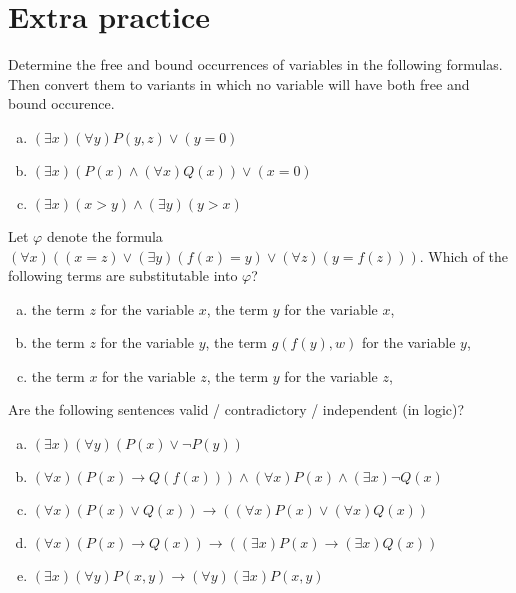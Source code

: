         
        
\section*{Extra practice}


\begin{problem}

    Determine the free and bound occurrences of variables in the following formulas. Then convert them to variants in which no variable will have both free and bound occurence.
    \begin{enumerate}[(a)]
        \item $(\exists x)(\forall y)P(y,z) \vee (y=0)$
        \item $(\exists x)(P(x) \wedge (\forall x)Q(x)) \vee (x=0)$
        \item $(\exists x)(x>y) \wedge (\exists y)(y>x)$
    \end{enumerate}

\end{problem}


\begin{problem}
    
    Let $\varphi$ denote the formula $(\forall x)((x=z) \vee (\exists y)(f(x)=y) \vee (\forall z)(y=f(z)))$. Which of the following terms are substitutable into $\varphi$?
    \begin{enumerate}[(a)]
        \item the term $z$ for the variable $x$, the term $y$ for the variable $x$,
        \item the term $z$ for the variable $y$, the term $g(f(y),w)$ for the variable $y$,
        \item the term $x$ for the variable $z$, the term $y$ for the variable $z$,
    \end{enumerate}

\end{problem}


\begin{problem}

    Are the following sentences valid / contradictory / independent (in logic)?

    \begin{enumerate}[(a)]
        \item $(\exists x)(\forall y)(P(x) \vee \neg P(y))$
        \item $(\forall x)(P(x)\to Q(f(x))) \wedge (\forall x)P(x) \wedge (\exists x)\neg Q(x)$
        \item $(\forall x)(P(x) \vee Q(x)) \to ((\forall x)P(x) \vee (\forall x)Q(x))$
        \item $(\forall x)(P(x)\to Q(x)) \to ((\exists x)P(x)\to(\exists x)Q(x))$
        \item $(\exists x)(\forall y)P(x,y) \to (\forall y)(\exists x)P(x,y)$
    \end{enumerate}

\end{problem}


